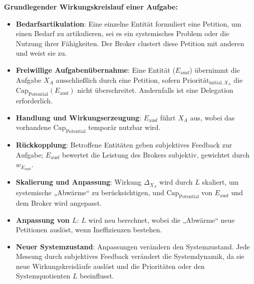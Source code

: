 \documentclass[12pt]{scrartcl}
\begin{document}
\textbf{Grundlegender Wirkungskreislauf einer Aufgabe:}
\begin{itemize}
    \item \textbf{Bedarfsartikulation}: Eine einzelne Entität formuliert eine Petition, um einen Bedarf zu artikulieren, sei es ein systemisches Problem oder die Nutzung ihrer Fähigkeiten. Der Broker clustert diese Petition mit anderen und weist sie zu.
    \item \textbf{Freiwillige Aufgabenübernahme}: Eine Entität ($E_{\text{ausf}}$) übernimmt die Aufgabe $X_A$ ausschließlich durch eine Petition, sofern $\text{Priorität}_{\text{initial}, X_A}$ die $\text{Cap}_{\text{Potential}}(E_{\text{ausf}})$ nicht überschreitet. Andernfalls ist eine Delegation erforderlich.
    \item \textbf{Handlung und Wirkungserzeugung}: $E_{\text{ausf}}$ führt $X_A$ aus, wobei das vorhandene $\text{Cap}_{\text{Potential}}$ temporär nutzbar wird.
    \item \textbf{Rückkopplung}: Betroffene Entitäten geben subjektives Feedback zur Aufgabe; $E_{\text{ausf}}$ bewertet die Leistung des Brokers subjektiv, gewichtet durch $w_{E_{\text{ausf}}}$.
    \item \textbf{Skalierung und Anpassung}: Wirkung $\Delta_{X_A}$ wird durch $L$ skaliert, um systemische „Abwärme“ zu berücksichtigen, und $\text{Cap}_{\text{Potential}}$ von $E_{\text{ausf}}$ und dem Broker wird angepasst.
    \item \textbf{Anpassung von $L$}: $L$ wird neu berechnet, wobei die „Abwärme“ neue Petitionen auslöst, wenn Ineffizienzen bestehen.
    \item \textbf{Neuer Systemzustand}: Anpassungen verändern den Systemzustand. Jede Messung durch subjektives Feedback verändert die Systemdynamik, da sie neue Wirkungskreisläufe auslöst und die Prioritäten oder den Systemquotienten $L$ beeinflusst.
\end{itemize}
\end{document}
